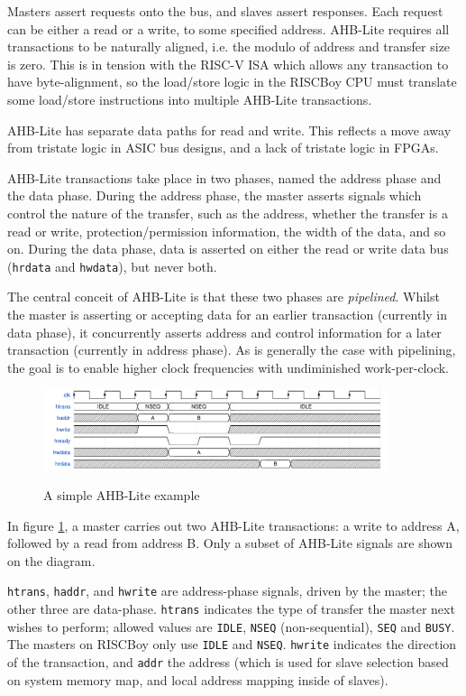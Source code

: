 \documentclass[notitlepage]{article}
\begin{document}
Masters assert requests onto the bus, and slaves assert responses. Each request can be either a read or a write, to some specified address. AHB-Lite requires all transactions to be naturally aligned, i.e. the modulo of address and transfer size is zero. This is in tension with the RISC-V ISA which allows any transaction to have byte-alignment, so the load/store logic in the RISCBoy CPU must translate some load/store instructions into multiple AHB-Lite transactions.

AHB-Lite has separate data paths for read and write. This reflects a move away from tristate logic in ASIC bus designs, and a lack of tristate logic in FPGAs.

AHB-Lite transactions take place in two phases, named the address phase and the data phase. During the address phase, the master asserts signals which control the nature of the transfer, such as the address, whether the transfer is a read or write, protection/permission information, the width of the data, and so on. During the data phase, data is asserted on either the read or write data bus (\texttt{hrdata} and \texttt{hwdata}), but never both.

The central conceit of AHB-Lite is that these two phases are \textit{pipelined}. Whilst the master is asserting or accepting data for an earlier transaction (currently in data phase), it concurrently asserts address and control information for a later transaction (currently in address phase). As is generally the case with pipelining, the goal is to enable higher clock frequencies with undiminished work-per-clock.

\begin{figure}[H]
\centering
\caption{A simple AHB-Lite example}
\includegraphics[width=0.9\textwidth]{waves/ahbl_basic.pdf}
\label{diagram:ahbl_basic}
\end{figure}

In figure \ref{diagram:ahbl_basic}, a master carries out two AHB-Lite transactions: a write to address A, followed by a read from address B. Only a subset of AHB-Lite signals are shown on the diagram.

\texttt{htrans}, \texttt{haddr}, and \texttt{hwrite} are address-phase signals, driven by the master; the other three are data-phase. \texttt{htrans} indicates the type of transfer the master next wishes to perform; allowed values are \texttt{IDLE}, \texttt{NSEQ} (non-sequential), \texttt{SEQ} and \texttt{BUSY}. The masters on RISCBoy only use \texttt{IDLE} and \texttt{NSEQ}. \texttt{hwrite} indicates the direction of the transaction, and \texttt{addr} the address (which is used for slave selection based on system memory map, and local address mapping inside of slaves).
\end{document}

